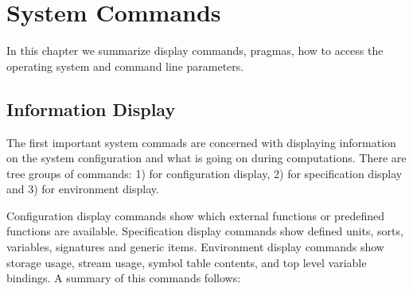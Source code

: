 

\chapter{System Commands} %

In this chapter we summarize display commands, pragmas, 
how to access the operating system and command line parameters. 

\section{Information Display} %

The first important system commads are concerned with 
displaying information on the system configuration and 
what is going on during computations.
There are tree groups of commands: 
1) for configuration display,
2) for specification display and 
3) for environment display.

Configuration display commands show which 
external functions or predefined functions are available. 
Specification display commands show 
defined units, sorts, variables, signatures and generic items.
Environment display commands show 
storage usage, stream usage, symbol table contents, 
and top level variable bindings.
A summary of this commands follows:

